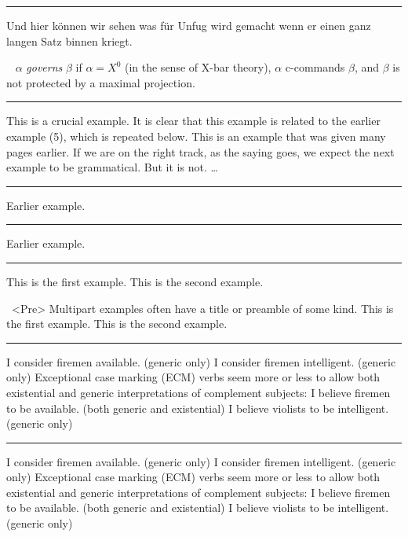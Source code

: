 \documentclass[12pt]{article}
\begin{document}
\filbreak\hrule\medskip

\begingroup
\ex
Und hier k\"onnen wir sehen was f\"ur Unfug wird gemacht
wenn er einen ganz langen Satz binnen kriegt.\par\nobreak
\xe

\ex~
$\alpha$ {\it governs\/} $\beta$ if $\alpha=X^0$ (in the
sense of X-bar theory), $\alpha$ c-commands $\beta$, and $\beta$
is not protected by a maximal projection.
\xe
\endgroup
\bigskip

\filbreak\hrule\medskip

\begingroup
\ex This is a crucial example.\xe
It is clear that this example is related to the earlier
example (5), which is repeated below.
\ex[exno=5]
This is an example that was given many pages earlier.\xe
If we are on the right track, as the saying goes,
we expect the next example to be grammatical.  But it is not.
\ex * \dots\xe
\endgroup
\bigskip

\filbreak\hrule\medskip

\begingroup
\ex[exno=$\Delta$] Earlier example.\xe
\endgroup
\bigskip

\filbreak\hrule\medskip

\begingroup
\ex[exno={[14, repeated]},exnoformat=X] Earlier example.\xe
\endgroup
\bigskip

\filbreak\hrule\medskip

\begingroup
\pex
\a This is the first example.
\a This is the second example.
\xe

\pex~<Pre> Multipart examples often have a title or preamble of some
kind.
\a This is the first example.
\a This is the second example.
\xe
\endgroup
\bigskip

\filbreak\hrule\medskip

\begingroup
\keepexcntlocal {}
\pex
\a I consider firemen available. (generic only)
\a I consider firemen intelligent. (generic only)
\xe
Exceptional case marking (ECM) verbs seem more or less to allow both
existential and generic interpretations of complement subjects:
\pex
\a I believe firemen to be available. (both generic and existential)
\a I believe violists to be intelligent. (generic only)
\xe
\endgroup
\bigskip

\filbreak\hrule\medskip

\begingroup
\keepexcntlocal {}
\pex[sampleexno=(10)]
\a I consider firemen available. (generic only)
\a I consider firemen intelligent. (generic only)
\xe
Exceptional case marking (ECM) verbs seem more or less to allow both
existential and generic interpretations of complement subjects:
\pex
\a I believe firemen to be available. (both generic and existential)
\a I believe violists to be intelligent. (generic only)
\xe
\endgroup
\bigskip
\end{document}
